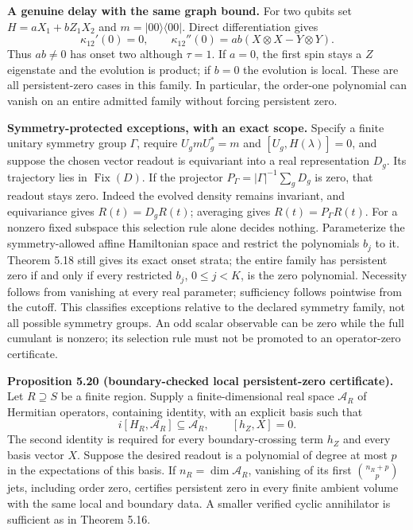 \documentclass[
  11pt,
]{article}
\begin{document}
\textbf{A genuine delay with the same graph bound.} For two qubits set
\(H=aX_1+bZ_1X_2\) and \(m=|00\rangle\langle00|\). Direct differentiation gives
\[
 \kappa_{12}'(0)=0,\qquad
 \kappa_{12}''(0)=ab(X\otimes X-Y\otimes Y).
\]
Thus \(ab\ne0\) has onset two although \(\tau=1\). If \(a=0\), the first spin
stays a \(Z\) eigenstate and the evolution is product; if \(b=0\) the evolution
is local. These are all persistent-zero cases in this family. In particular,
the order-one polynomial can vanish on an entire admitted family without
forcing persistent zero.

\textbf{Symmetry-protected exceptions, with an exact scope.} Specify a finite
unitary symmetry group \(\Gamma\), require \(U_gmU_g^*=m\) and
\([U_g,H(\lambda)]=0\), and suppose the chosen vector readout is equivariant
into a real representation \(D_g\). Its trajectory lies in
\(\operatorname{Fix}(D)\). If the projector
\(P_\Gamma=|\Gamma|^{-1}\sum_gD_g\) is zero, that readout stays zero.
Indeed the evolved density remains invariant, and equivariance gives
\(R(t)=D_gR(t)\); averaging gives \(R(t)=P_\Gamma R(t)\).
For a nonzero fixed subspace this selection rule alone decides nothing.
Parameterize the symmetry-allowed affine Hamiltonian space and restrict the
polynomials \(b_j\) to it. Theorem 5.18 still gives its exact onset strata;
the entire family has persistent zero if and only if every restricted
\(b_j\), \(0\le j<K\), is the zero polynomial. Necessity follows from vanishing
at every real parameter; sufficiency follows pointwise from the cutoff.
This classifies exceptions relative to the declared symmetry family, not
all possible symmetry groups. An odd scalar observable can be zero while
the full cumulant is nonzero; its selection rule must not be promoted to
an operator-zero certificate.

\textbf{Proposition 5.20 (boundary-checked local persistent-zero certificate).}
Let \(R\supseteq S\) be a finite region. Supply a finite-dimensional real
space \(\mathcal A_R\) of Hermitian operators, containing identity, with an
explicit basis such that
\[
 i[H_R,\mathcal A_R]\subseteq\mathcal A_R,
 \qquad [h_Z,X]=0.
\]
The second identity is required for every boundary-crossing term \(h_Z\)
and every basis vector \(X\).
Suppose the desired readout is a polynomial of degree at most \(p\) in the
expectations of this basis. If \(n_R=\dim\mathcal A_R\), vanishing of its
first \({n_R+p\choose p}\) jets, including order zero, certifies persistent
zero in every finite ambient volume with the same local and boundary data.
A smaller verified cyclic annihilator is sufficient as in Theorem 5.16.
\end{document}
